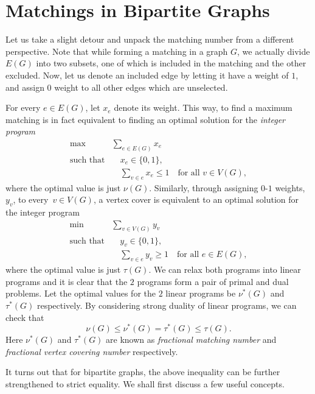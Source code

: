 \documentclass[math]{amznotes}
\theoremstyle{remark}
\newcommand{\0}{\mathbf{0}}
\newcommand{\1}{\mathbf{1}}
\begin{document}
\section{Matchings in Bipartite Graphs}
Let us take a slight detour and unpack the matching number from a different perspective. Note that while forming a matching in a graph $G$, we actually divide $E(G)$ into two subsets, one of which is included in the matching and the other excluded. Now, let us denote an included edge by letting it have a weight of $1$, and assign $0$ weight to all other edges which are unselected.

For every $e \in E(G)$, let $x_e$ denote its weight. This way, to find a maximum matching is in fact equivalent to finding an optimal solution for the \textit{integer program}
\begin{align*}
    \max & \sum_{e \in E(G)}x_e \\
    \textrm{such that} & \quad x_e \in \{0, 1\}, \\
    & \quad \sum_{v \in e}x_e \leq 1 \quad\textrm{for all } v \in V(G),
\end{align*}
where the optimal value is just $\nu(G)$. Similarly, through assigning $0$-$1$ weights, $y_v$, to every~$v \in V(G)$, a vertex cover is equivalent to an optimal solution for the integer program 
\begin{align*}
    \min & \sum_{v \in V(G)}y_v \\
    \textrm{such that} & \quad y_v \in \{0, 1\}, \\
    & \quad \sum_{v \in e}y_v \geq 1 \quad \textrm{for all } e \in E(G),
\end{align*}
where the optimal value is just $\tau(G)$. We can relax both programs into linear programs and it is clear that the $2$ programs form a pair of primal and dual problems. Let the optimal values for the $2$ linear programs be $\nu^*(G)$ and $\tau^*(G)$ respectively. By considering strong duality of linear programs, we can check that
\begin{equation*}
    \nu(G) \leq \nu^*(G) = \tau^*(G) \leq \tau(G).
\end{equation*}
Here $\nu^*(G)$ and $\tau^*(G)$ are known as \textit{fractional matching number} and \textit{fractional vertex covering number} respectively.

It turns out that for bipartite graphs, the above inequality can be further strengthened to strict equality. We shall first discuss a few useful concepts.
\end{document}
